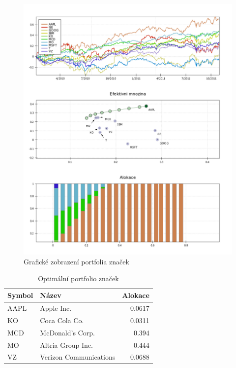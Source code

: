 \documentclass[12pt,a4paper]{report}
\begin{document}
    \begin{figure}[htb]
      \centering
        \includegraphics[height=0.90\textheight]{brands1.png}
       \caption{Grafické zobrazení portfolia značek}
    \end{figure}

    \begin{table}[htb]
      \centering
      \begin{tabular}{|l|l|r|}
        \hline
        Symbol&Název&Alokace\\\hline\hline
        AAPL&Apple Inc. &0.0617\\\hline
        KO&Coca Cola Co. &0.0311\\\hline
        MCD&McDonald's Corp. &0.394\\\hline
        MO&Altria Group Inc. &0.444\\\hline
        VZ&Verizon Communications &0.0688\\\hline
      \end{tabular}
      \caption{Optimální portfolio značek}
    \end{table}
    
\end{document}
